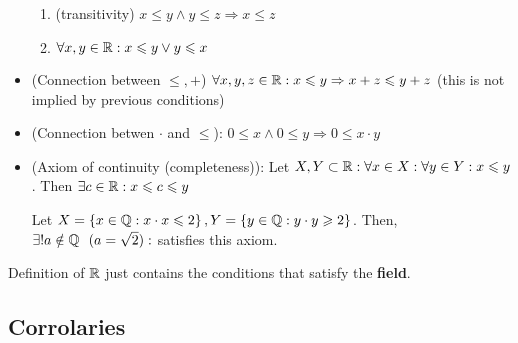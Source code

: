\begin{definition}[$\R$]
\begin{itemize}
\begin{enumerate}
				\item (transitivity) $x \leq y \wedge y \leq z \Rightarrow x \leq z$ 
				\item $\forall x,y \in \mathbb{R}: x \leqslant y \vee y \leqslant x$ 
			\end{enumerate}
		\item (Connection between $ \leq , + $) $\forall x,y,z \in \mathbb{R}: x \leqslant y \Rightarrow x + z \leqslant y + z$ (this is not implied by previous conditions)
		\item (Connection betwen $\cdot$ and $ \leq $): $0 \leq x \wedge 0 \leq y \Rightarrow 0 \leq x \cdot y$  
		\item (Axiom of continuity (completeness)): Let $X, Y \subset \mathbb{R}: \forall x \in X: \forall y \in Y: x \leqslant y$. Then $\exists c \in \mathbb{R}: x \leqslant c \leqslant y$
		\begin{example}
			Let $X = \left\{ x \in \mathbb{Q}: x \cdot x \leqslant 2  \right \}, Y = \left\{ y \in \mathbb{Q}: y \cdot y \geqslant 2 \right \}  $. Then, $\exists ! a \notin \mathbb{Q} \ \ (a = \sqrt{2}): $ satisfies this axiom.
		\end{example}
	\end{itemize}
\end{definition}

\begin{note}[]
	Definition of $\R$ just contains the conditions that satisfy the \textbf{field}.
\end{note}

\subsection{Corrolaries}

